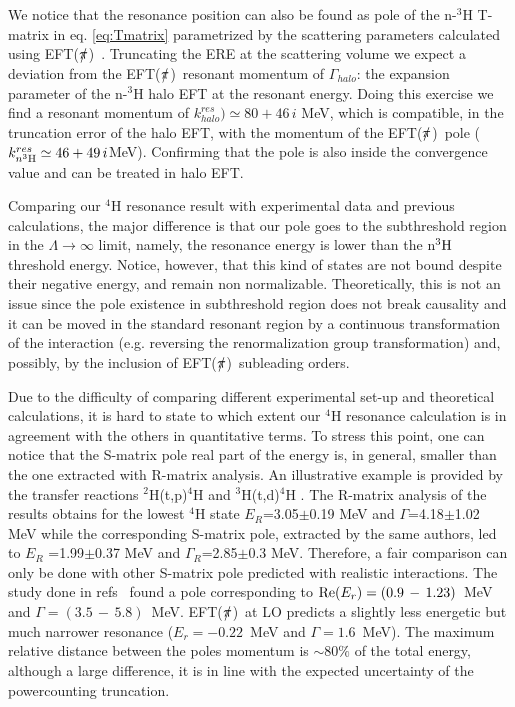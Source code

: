\documentclass[5p,times]{elsarticle}
\newcommand{\eftnopi}{\mbox{EFT($\slashed{\pi}$) }}
\begin{document}
%
We notice that the resonance position can also be found as pole of the n-$^3$H T-matrix in eq. \ref{eq:Tmatrix} parametrized by the scattering parameters calculated using \eftnopi. 
Truncating the ERE at the scattering volume we expect a deviation from the \eftnopi resonant momentum of $\Gamma_{halo}$: the expansion parameter of the n-$^3$H halo EFT at the resonant energy.
Doing this exercise we find a resonant momentum of $k^{res}_{halo})\simeq80+46\,i$ MeV, which is compatible, in the truncation error of the halo EFT, with the momentum of the \eftnopi pole ($k^{res}_{n ^3{\rm H}}\simeq46+49\,i$MeV).
Confirming that the pole is also inside the convergence value and can be treated in halo EFT.  
%

%
Comparing our $^4$H resonance result with experimental data and previous calculations, the major difference is that our pole goes to the subthreshold region in the $\Lambda\rightarrow\infty$ limit, namely, the resonance energy is lower than the n$^3{\rm H}$ threshold energy. 
Notice, however, that this kind of states are not bound despite their negative energy, and remain non normalizable.
Theoretically, this is not an issue since the pole existence in subthreshold region does not break causality and it can be moved in the standard resonant region by a continuous transformation of the interaction (e.g. reversing the renormalization group transformation) and, possibly, by the inclusion of \eftnopi subleading orders. 
%

%
Due to the difficulty of comparing different experimental set-up and theoretical calculations, it is hard to state to which extent our $^4$H resonance calculation is in agreement with the others in quantitative terms. 
%
To stress this point, one can notice that the S-matrix pole real part of the energy is, in general, smaller than the one extracted with R-matrix analysis.
An illustrative example is provided by the  transfer reactions $^2$H(t,p)$^4$H and $^3$H(t,d)$^4$H \cite{Sidorchuk:2004ntw}. 
The R-matrix analysis of the results obtains for the lowest $^4$H state $E_R$=3.05$\pm$0.19 MeV and $\Gamma$=4.18$\pm$1.02 MeV while the corresponding S-matrix pole, extracted by the same authors, led to $E_R$ =1.99$\pm$0.37 MeV and $\Gamma_R$=2.85$\pm$0.3 MeV. 
Therefore, a fair comparison can only be done with other S-matrix pole predicted with realistic interactions. 
%
The study done in refs~\cite{Lazauskas:2019hil,Arai:2003ek, deDiego:2007rd} found a pole corresponding to ${\rm Re}(E_r)=(0.9\,-\,1.23)$~MeV and $\Gamma=(3.5\,-\,5.8)$~MeV.
\eftnopi at LO predicts a slightly less energetic but much narrower resonance ($E_r=-0.22$~MeV and $\Gamma=1.6$~MeV). 
The maximum relative distance between the poles momentum is $\sim 80\%$ of the total energy, although a large difference, it is in line with the expected uncertainty of the powercounting truncation.
%
\end{document}
